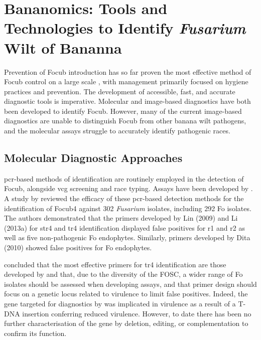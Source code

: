 \section{Bananomics: Tools and Technologies to Identify \textit{Fusarium} Wilt of Bananna}

Prevention of \ac{Focub} introduction has so far proven the most effective method of \ac{Focub} control on a large scale \parencite{Ploetz2015b}, with management primarily focused on hygiene practices and prevention. The development of accessible, fast, and accurate diagnostic tools is imperative. Molecular and image-based diagnostics have both been developed to identify \ac{Focub}. However, many of the current image-based diagnostics are unable to distinguish \ac{Focub} from other banana wilt pathogens, and the molecular assays struggle to accurately identify pathogenic races.  

\subsection{Molecular Diagnostic Approaches}
\Ac{pcr}-based methods of identification are routinely employed in the detection of \ac{Focub}, alongside \ac{vcg} screening and race typing. Assays have been developed by \textcite{Lin2009, Dita2010, Li2013a, Li2013b}. A study by \textcite{Magdama2019} reviewed the efficacy of these \ac{pcr}-based detection methods for the identification of \ac{Focub4} against 302 \textit{Fusarium} isolates, including 292 \ac{Fo} isolates. The authors demonstrated that the primers developed by Lin \et (2009) and Li \et (2013a) for \ac{str4} and \ac{tr4} identification displayed false positives for \ac{r1} and \ac{r2} as well as five non-pathogenic \ac{Fo} endophytes. Similarly, primers developed by Dita \et (2010) showed false positives for \ac{Fo} endophytes. 

\textcite{Magdama2019} concluded that the most effective primers for \ac{tr4} identification are those developed by \textcite {Li2013b} and that, due to the diversity of the \ac{FOSC}, a wider range of \ac{Fo} isolates should be assessed when developing assays, and that primer design should focus on a genetic locus related to virulence to limit false positives.  Indeed, the gene targeted for diagnostics by \textcite {Li2013b} was implicated in virulence as a result of a T-DNA insertion conferring reduced virulence. However, to date there has been  no further characterisation of the gene by deletion, editing, or complementation to confirm its function.  

